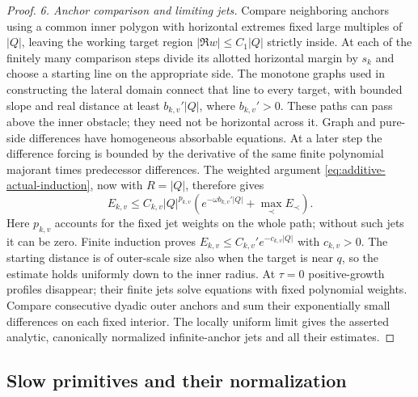 \begin{proof}
\emph{6. Anchor comparison and limiting jets.}
Compare neighboring anchors using a common inner polygon with
horizontal extremes fixed large multiples of $|Q|$, leaving the
working target region $|\Re w|\le C_1|Q|$ strictly inside.  At each of
the finitely many comparison steps divide its allotted horizontal
margin by $s_k$ and choose a starting line on the appropriate side.
The monotone graphs used in constructing the lateral domain connect
that line to every target, with bounded slope and real distance at
least $b_{k,v}'|Q|$, where $b_{k,v}'>0$.  These paths can pass above the
inner obstacle; they need not be horizontal across it.  Graph and
pure-side differences have homogeneous absorbable equations.  At a
later step the difference forcing is bounded by the derivative of the
same finite polynomial majorant times predecessor differences.
The weighted argument \eqref{eq:additive-actual-induction}, now with
$R=|Q|$, therefore gives
\[
 E_{k,v}\le C_{k,v}|Q|^{p_{k,v}}
 \left(e^{-\omega b_{k,v}'|Q|}
                 +\max_{\prec}E_{\prec}\right).
\]
Here $p_{k,v}$ accounts for the fixed jet weights on the whole path;
without such jets it can be zero.  Finite induction proves
$E_{k,v}\le C_{k,v}'e^{-c_{k,v}|Q|}$ with $c_{k,v}>0$.
The starting distance is of outer-scale size also when the target is
near $q$, so the estimate holds uniformly down to the inner radius.
At $\tau=0$
positive-growth profiles disappear; their finite jets solve equations
with fixed polynomial weights.  Compare consecutive dyadic outer
anchors and sum their exponentially small differences on each fixed
interior.  The locally uniform limit gives the asserted analytic,
canonically normalized infinite-anchor jets and all their estimates.
\end{proof}

\subsection{Slow primitives and their normalization}

